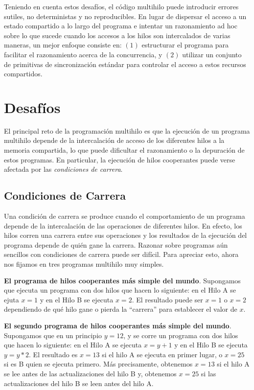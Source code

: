 \documentclass[10pt]{book}
\begin{document}
Teniendo en cuenta estos desafíos, el código multihilo puede introducir errores sutiles, no deterministas y no reproducibles. En lugar de dispersar el acceso a un estado compartido a lo largo del programa e intentar un razonamiento ad hoc sobre lo que sucede cuando los accesos a los hilos son intercalados de varias maneras, un mejor enfoque consiste en: $(1)$ estructurar el programa para facilitar el razonamiento acerca de la concurrencia, y $(2)$ utilizar un conjunto de primitivas de sincronización estándar para controlar el acceso a estos recursos compartidos.

\section{Desafíos}
El principal reto de la programación multihilo es que la ejecución de un programa multihilo depende de la intercalación de acceso de los diferentes hilos a la memoria compartida, lo que puede dificultar el razonamiento o la depuración de estos programas. En particular, la ejecución de hilos cooperantes puede verse afectada por las \textit{condiciones de carrera}.

\subsection{Condiciones de Carrera}
Una condición de carrera se produce cuando el comportamiento de un programa depende de la intercalación de las operaciones de diferentes hilos. En efecto, los hilos corren una carrera entre sus operaciones y los resultados de la ejecución del programa depende de quién gane la carrera. Razonar sobre programas aún sencillos con condiciones de carrera puede ser difícil. Para apreciar esto, ahora nos fijamos en tres programas multihilo muy simples.

\textbf{El programa de hilos cooperantes más simple del mundo}. Supongamos que ejecuta un programa con dos hilos que hacen lo siguiente: en el Hilo A se ejuta $x = 1$ y en el Hilo B se ejecuta $x = 2$. El resultado puede ser $x = 1$ o $x = 2$ dependiendo de qué hilo gane o pierda la ``carrera'' para establecer el valor de $x$.

\textbf{El segundo programa de hilos cooperantes más simple del mundo}. Supongamos que en un principio $y = 12$, y se corre un programa con dos hilos que hacen lo siguiente: en el Hilo A se ejecuta $x = y + 1$ y en el Hilo B se ejecuta $y = y * 2$. El resultado es $x = 13$ si el hilo A se ejecuta en primer lugar, o $x = 25$ si es B quien se ejecuta primero. Más precisamente, obtenemos $x = 13$ si el hilo A se lee antes de las actualizaciones del hilo B y, obtenemos $x = 25$ si las actualizaciones del hilo B se leen antes del hilo A.
\end{document}
